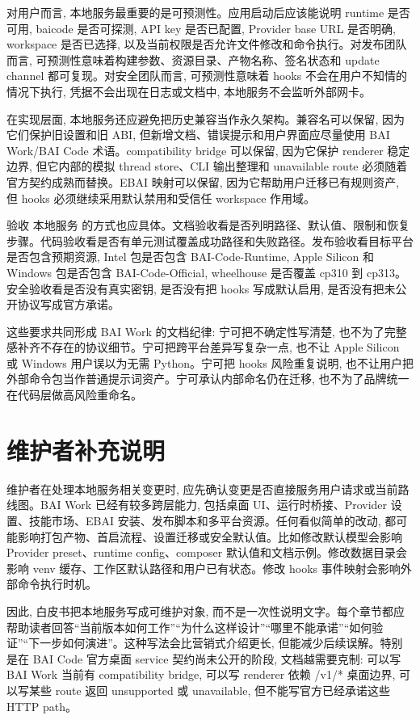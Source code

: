 对用户而言, 本地服务最重要的是可预测性。应用启动后应该能说明 runtime 是否可用, baicode 是否可探测, API key 是否已配置, Provider base URL 是否明确, workspace 是否已选择, 以及当前权限是否允许文件修改和命令执行。对发布团队而言, 可预测性意味着构建参数、资源目录、产物名称、签名状态和 update channel 都可复现。对安全团队而言, 可预测性意味着 hooks 不会在用户不知情的情况下执行, 凭据不会出现在日志或文档中, 本地服务不会监听外部网卡。

在实现层面, 本地服务还应避免把历史兼容当作永久架构。兼容名可以保留, 因为它们保护旧设置和旧 ABI, 但新增文档、错误提示和用户界面应尽量使用 BAI Work/BAI Code 术语。compatibility bridge 可以保留, 因为它保护 renderer 稳定边界, 但它内部的模拟 thread store、CLI 输出整理和 unavailable route 必须随着官方契约成熟而替换。EBAI 映射可以保留, 因为它帮助用户迁移已有规则资产, 但 hooks 必须继续采用默认禁用和受信任 workspace 作用域。

验收 本地服务 的方式也应具体。文档验收看是否列明路径、默认值、限制和恢复步骤。代码验收看是否有单元测试覆盖成功路径和失败路径。发布验收看目标平台是否包含预期资源, Intel 包是否包含 BAI-Code-Runtime, Apple Silicon 和 Windows 包是否包含 BAI-Code-Official, wheelhouse 是否覆盖 cp310 到 cp313。安全验收看是否没有真实密钥, 是否没有把 hooks 写成默认启用, 是否没有把未公开协议写成官方承诺。

这些要求共同形成 BAI Work 的文档纪律: 宁可把不确定性写清楚, 也不为了完整感补齐不存在的协议细节。宁可把跨平台差异写复杂一点, 也不让 Apple Silicon 或 Windows 用户误以为无需 Python。宁可把 hooks 风险重复说明, 也不让用户把外部命令包当作普通提示词资产。宁可承认内部命名仍在迁移, 也不为了品牌统一在代码层做高风险重命名。

\section{维护者补充说明}

维护者在处理本地服务相关变更时, 应先确认变更是否直接服务用户请求或当前路线图。BAI Work 已经有较多跨层能力, 包括桌面 UI、运行时桥接、Provider 设置、技能市场、EBAI 安装、发布脚本和多平台资源。任何看似简单的改动, 都可能影响打包产物、首启流程、设置迁移或安全默认值。比如修改默认模型会影响 Provider preset、runtime config、composer 默认值和文档示例。修改数据目录会影响 venv 缓存、工作区默认路径和用户已有状态。修改 hooks 事件映射会影响外部命令执行时机。

因此, 白皮书把本地服务写成可维护对象, 而不是一次性说明文字。每个章节都应帮助读者回答“当前版本如何工作”“为什么这样设计”“哪里不能承诺”“如何验证”“下一步如何演进”。这种写法会比营销式介绍更长, 但能减少后续误解。特别是在 BAI Code 官方桌面 service 契约尚未公开的阶段, 文档越需要克制: 可以写 BAI Work 当前有 compatibility bridge, 可以写 renderer 依赖 /v1/* 桌面边界, 可以写某些 route 返回 unsupported 或 unavailable, 但不能写官方已经承诺这些 HTTP path。

